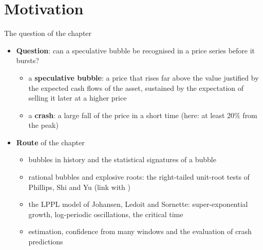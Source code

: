 \section{Motivation}

\begin{frame}{The question of the chapter}
\itemsize{\small}
\begin{itemize}
    \item \textbf{Question}: can a speculative bubble be recognised in a price series before it bursts?
    \begin{itemize}
        \item a \textbf{speculative bubble}: a price that rises far above the value justified by the expected cash flows of the asset, sustained by the expectation of selling it later at a higher price
        \item a \textbf{crash}: a large fall of the price in a short time (here: at least 20\% from the peak)
    \end{itemize}
    \item \textbf{Route} of the chapter
    \begin{itemize}
        \item bubbles in history and the statistical signatures of a bubble
        \item rational bubbles and explosive roots: the right-tailed unit-root tests of Phillips, Shi and Yu (link with )
        \item the LPPL model of Johansen, Ledoit and Sornette: super-exponential growth, log-periodic oscillations, the critical time
        \item estimation, confidence from many windows and the evaluation of crash predictions
    \end{itemize}
\end{itemize}
\end{frame}

